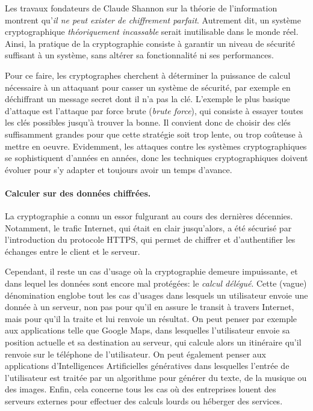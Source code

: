 Les travaux fondateurs de Claude Shannon sur la théorie de l'information montrent qu'\textit{il ne peut exister de chiffrement parfait}. Autrement dit, un système cryptographique \textit{théoriquement incassable} serait inutilisable dans le monde réel. Ainsi, la pratique de la cryptographie consiste à garantir un niveau de sécurité suffisant à un système, sans altérer sa fonctionnalité ni ses performances.

Pour ce faire, les cryptographes cherchent à déterminer la puissance de calcul nécessaire à un attaquant pour casser un système de sécurité, par exemple en déchiffrant un message secret dont il n'a pas la clé. L'exemple le plus basique d'attaque est l'attaque par force brute (\textit{brute force}), qui consiste à essayer toutes les clés possibles jusqu'à trouver la bonne. Il convient donc de choisir des clés suffisamment grandes pour que cette stratégie soit trop lente, ou trop coûteuse à mettre en oeuvre. Evidemment, les attaques contre les systèmes cryptographiques se sophistiquent d'années en années, donc les techniques cryptographiques doivent évoluer pour s'y adapter et toujours avoir un temps d'avance.



\paragraph{Calculer sur des données chiffrées.}
La cryptographie a connu un essor fulgurant au cours des dernières décennies. Notamment, le trafic Internet, qui était en clair jusqu'alors, a été sécurisé par l'introduction du protocole HTTPS, qui permet de chiffrer et d'authentifier les échanges entre le client et le serveur.

Cependant, il reste un cas d'usage où la cryptographie demeure impuissante, et dans lequel les données sont encore mal protégées: le \textit{calcul délégué}. Cette (vague) dénomination englobe tout les cas d'usages dans lesquels un utilisateur envoie une donnée à un serveur, non pas pour qu'il en assure le transit à travers Internet, mais pour qu'il la traite et lui renvoie un résultat. On peut penser par exemple aux applications telle que Google Maps, dans lesquelles l'utilisateur envoie sa position actuelle et sa destination au serveur, qui calcule alors un itinéraire qu'il renvoie sur le téléphone de  l'utilisateur. On peut également penser aux applications d'Intelligences Artificielles génératives dans lesquelles l'entrée de l'utilisateur est traitée par un algorithme pour générer du texte, de la musique ou des images. Enfin, cela concerne tous les cas où des entreprises louent des serveurs externes pour effectuer des calculs lourds ou héberger des services.

